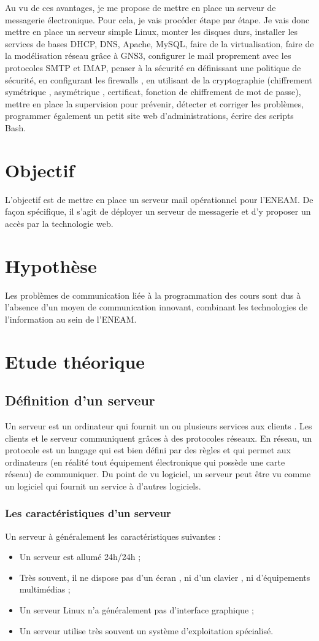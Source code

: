 \documentclass[a4paper,12pt,french]{report} %
\begin{document}
	Au vu de ces avantages, je me propose de mettre en place un serveur de messagerie électronique.
Pour cela, je vais procéder étape par étape. Je vais donc mettre en place un serveur simple Linux, monter les disques durs, installer les services de bases DHCP, DNS, Apache,  MySQL, faire de la virtualisation, faire de la modélisation réseau grâce à GNS3, configurer le mail proprement avec les protocoles SMTP et IMAP, penser à la sécurité en définissant une politique de sécurité, en configurant les firewalls , en utilisant de la cryptographie (chiffrement symétrique , asymétrique , certificat, fonction de chiffrement de mot de passe),  mettre en place la supervision pour prévenir, détecter et corriger les problèmes, programmer également un petit site web d'administrations, écrire des scripts Bash.  
	\section{Objectif}
	L'objectif est de mettre en place un serveur mail opérationnel pour l'ENEAM. De façon spécifique, il s'agit de déployer un serveur de messagerie et d'y proposer un accès par la technologie web.
	\section{Hypothèse}
	Les problèmes de communication liée à la programmation des cours sont dus à l'absence d'un moyen de communication innovant, combinant les technologies de l'information au sein de l'ENEAM.
	\section{Etude théorique}
		\subsection{Définition d'un serveur}
		Un serveur est un ordinateur qui fournit un ou plusieurs services aux clients . Les clients et le serveur communiquent grâces à des protocoles réseaux. En réseau, un protocole est un langage qui est bien défini par des règles et qui permet aux ordinateurs (en réalité tout équipement électronique qui possède une carte réseau) de communiquer. Du point de vu logiciel, un serveur peut être vu comme un logiciel qui fournit un service à d'autres logiciels.

\subsubsection{Les caractéristiques d'un serveur}
Un serveur à généralement les caractéristiques suivantes :
\begin{itemize}
\item Un serveur est allumé 24h/24h ;
\item Très souvent, il ne dispose pas d'un écran , ni d'un clavier , ni d'équipements multimédias ;
\item Un serveur Linux n'a généralement pas d'interface graphique ;
\item Un serveur utilise très souvent un système d'exploitation spécialisé.
\end{itemize}
\end{document}
